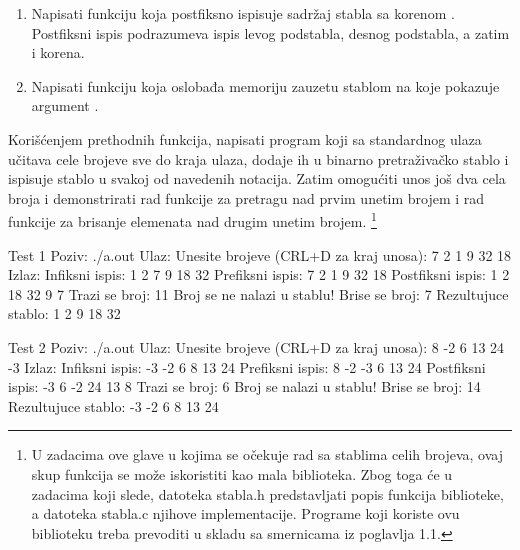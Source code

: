 \begin{Exercise}[label=701]
\begin{enumerate}
\item Napisati funkciju  koja postfiksno ispisuje sadržaj stabla sa korenom . Postfiksni ispis podrazumeva ispis levog podstabla, desnog podstabla, a zatim i korena.

\item Napisati funkciju  koja oslobađa memoriju zauzetu stablom na koje pokazuje argument .
\end{enumerate}

Korišćenjem prethodnih funkcija, napisati program koji sa standardnog ulaza učitava cele brojeve sve do kraja ulaza, dodaje ih u binarno pretraživačko stablo i ispisuje stablo u svakoj od navedenih notacija. Zatim omogućiti unos još dva cela broja i demonstrirati rad funkcije za pretragu nad prvim unetim brojem i rad funkcije za brisanje elemenata nad drugim unetim brojem. 
\footnote{U zadacima ove glave u kojima se očekuje rad sa stablima celih brojeva, ovaj skup funkcija se može iskoristiti kao mala biblioteka. Zbog toga će u zadacima koji slede, datoteka stabla.h predstavljati popis funkcija biblioteke, a datoteka stabla.c njihove implementacije. Programe koji koriste ovu biblioteku treba prevoditi u skladu sa smernicama iz poglavlja 1.1.}

\begin{maxitest}
\begin{test}{Test 1}
Poziv: ./a.out
Ulaz:
	Unesite brojeve (CRL+D za kraj unosa): 7 2 1 9 32 18
Izlaz:
	Infiksni ispis: 1 2 7 9 18 32
	Prefiksni ispis: 7 2 1 9 32 18
	Postfiksni ispis: 1 2 18 32 9 7
	Trazi se broj: 11
	Broj se ne nalazi u stablu!
	Brise se broj: 7
	Rezultujuce stablo: 1 2 9 18 32
\end{test}
\end{maxitest}

\begin{maxitest}
\begin{test}{Test 2}
Poziv: ./a.out
Ulaz:
	Unesite brojeve (CRL+D za kraj unosa): 8 -2 6 13 24 -3
Izlaz:
	Infiksni ispis:  -3 -2 6 8 13 24
	Prefiksni ispis: 8 -2 -3 6 13 24
	Postfiksni ispis: -3 6 -2 24 13 8 
	Trazi se broj: 6
	Broj se nalazi u stablu!
	Brise se broj: 14
	Rezultujuce stablo: -3 -2 6 8 13 24
\end{test}
\end{maxitest}

\end{Exercise}

\begin{Answer}[ref=701]
\end{Answer}



